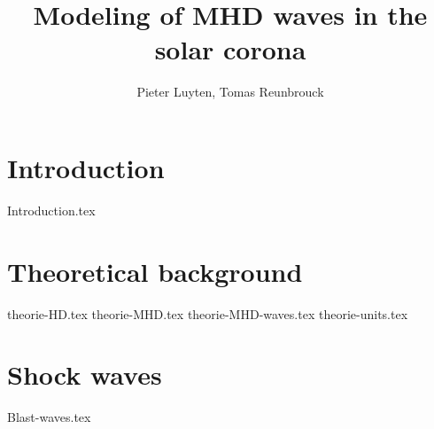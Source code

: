\documentclass[a4paper]{article}
\title{Modeling of MHD waves in the solar corona}
\author{Pieter Luyten, Tomas Reunbrouck}
\begin{document}
\maketitle
\newpage
\tableofcontents
\newpage

\section{Introduction}
{Introduction.tex}
\cite{notes-fluid-dynamics}



\section{Theoretical background}
{theorie-HD.tex}
{theorie-MHD.tex}
{theorie-MHD-waves.tex}
{theorie-units.tex}

\section{Shock waves}
{Blast-waves.tex}

\end{document}
